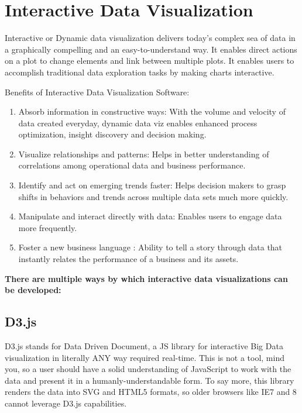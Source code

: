 \documentclass[]{book}
\providecommand{\tightlist}{%
  \setlength{\itemsep}{0pt}\setlength{\parskip}{0pt}}
\theoremstyle{definition}
\theoremstyle{definition}
\theoremstyle{definition}
\theoremstyle{remark}
\begin{document}
\section{Interactive Data
Visualization}\label{interactive-data-visualization}

Interactive or Dynamic data visualization delivers today's complex sea
of data in a graphically compelling and an easy-to-understand way. It
enables direct actions on a plot to change elements and link between
multiple plots. It enables users to accomplish traditional data
exploration tasks by making charts
interactive\citep{benefits_interactive_viz}.

Benefits of Interactive Data Visualization Software:

\begin{enumerate}
\def\labelenumi{\arabic{enumi}.}
\tightlist
\item
  Absorb information in constructive ways: With the volume and velocity
  of data created everyday, dynamic data viz enables enhanced process
  optimization, insight discovery and decision making.
\item
  Visualize relationships and patterns: Helps in better understanding of
  correlations among operational data and business performance.
\item
  Identify and act on emerging trends faster: Helps decision makers to
  grasp shifts in behaviors and trends across multiple data sets much
  more quickly.
\item
  Manipulate and interact directly with data: Enables users to engage
  data more frequently.
\item
  Foster a new business language : Ability to tell a story through data
  that instantly relates the performance of a business and its assets.
\end{enumerate}

\textbf{There are multiple ways by which interactive data visualizations
can be developed:}

\subsection{D3.js}\label{d3.js}

D3.js stands for Data Driven Document, a JS library for interactive Big
Data visualization in literally ANY way required
real-time\citep{d3_interactive_viz}. This is not a tool, mind you, so a
user should have a solid understanding of JavaScript to work with the
data and present it in a humanly-understandable form. To say more, this
library renders the data into SVG and HTML5 formats, so older browsers
like IE7 and 8 cannot leverage D3.js capabilities.
\end{document}

